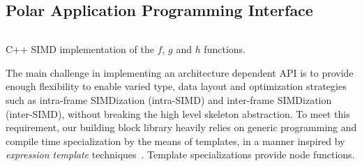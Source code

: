 
\subsection{Polar Application Programming Interface}
\label{sec:polar_api}


\begin{listing}[htp]
  \inputminted[frame=lines,linenos]{C++}{main/chapter3/src/polar/f_g_h_simd.cpp}
  \caption{C++ SIMD implementation of the $f$, $g$ and $h$ functions.}
  \label{lst:polar_f_g_h_simd}
\end{listing}

The main challenge in implementing an architecture dependent API is to provide
enough flexibility to enable varied type, data layout and optimization
strategies such as intra-frame SIMDization (intra-SIMD) and inter-frame
SIMDization (inter-SIMD), without breaking the high level skeleton abstraction.
To meet this requirement, our building block library heavily relies on generic
programming and compile time specialization by the means of \Cxx templates, in a
manner inspired by \emph{expression template} techniques~\cite{Stroustrup2013}.
Template specializations provide node functions.

